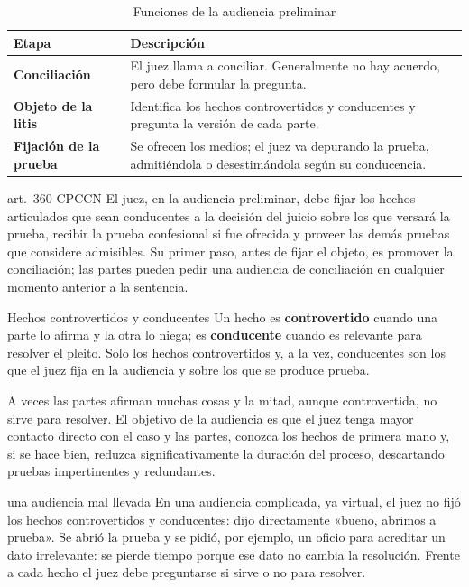 \documentclass[12pt,oneside]{book}
\begin{document}
\begin{table}[H]
\centering
\caption{Funciones de la audiencia preliminar}
\begin{tabularx}{\textwidth}{>{\raggedright\arraybackslash\bfseries}p{} X}
\toprule
Etapa & Descripción \\
\midrule
Conciliación & El juez llama a conciliar. Generalmente no hay acuerdo, pero debe formular la pregunta. \\
Objeto de la litis & Identifica los hechos controvertidos y conducentes y pregunta la versión de cada parte. \\
Fijación de la prueba & Se ofrecen los medios; el juez va depurando la prueba, admitiéndola o desestimándola según su conducencia. \\
\bottomrule
\end{tabularx}
\end{table}

\begin{regla}{art.~360 CPCCN}
El juez, en la audiencia preliminar, debe fijar los hechos articulados que sean conducentes a la decisión del juicio sobre los que versará la prueba, recibir la prueba confesional si fue ofrecida y proveer las demás pruebas que considere admisibles. Su primer paso, antes de fijar el objeto, es promover la conciliación; las partes pueden pedir una audiencia de conciliación en cualquier momento anterior a la sentencia.
\end{regla}

\begin{definicion}{Hechos controvertidos y conducentes}
Un hecho es \textbf{controvertido} cuando una parte lo afirma y la otra lo niega; es \textbf{conducente} cuando es relevante para resolver el pleito. Solo los hechos controvertidos y, a la vez, conducentes son los que el juez fija en la audiencia y sobre los que se produce prueba.
\end{definicion}

A veces las partes afirman muchas cosas y la mitad, aunque controvertida, no sirve para resolver. El objetivo de la audiencia es que el juez tenga mayor contacto directo con el caso y las partes, conozca los hechos de primera mano y, si se hace bien, reduzca significativamente la duración del proceso, descartando pruebas impertinentes y redundantes.

\begin{ejemplo}{una audiencia mal llevada}
En una audiencia complicada, ya virtual, el juez no fijó los hechos controvertidos y conducentes: dijo directamente «bueno, abrimos a prueba». Se abrió la prueba y se pidió, por ejemplo, un oficio para acreditar un dato irrelevante: se pierde tiempo porque ese dato no cambia la resolución. Frente a cada hecho el juez debe preguntarse si sirve o no para resolver.
\end{ejemplo}
\end{document}
